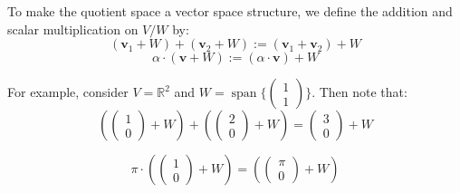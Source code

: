 To make the quotient space a vector space structure, we define the addition and scalar multiplication on \( V/W \) by:
\[
(\mathbf{v}_1 + W) + (\mathbf{v}_2 + W) := (\mathbf{v}_1 + \mathbf{v}_2) + W
\]
\[
\alpha \cdot (\mathbf{v} + W) := (\alpha \cdot \mathbf{v}) + W
\]

For example, consider \( V = \mathbb{R}^2 \) and \( W = \operatorname{span}\{\begin{pmatrix}
    1 \\ 1
\end{pmatrix}\} \). Then note that:
\[
\left( \left( \begin{array}{c} 1 \\ 0 \end{array} \right) + W \right)
+ \left( \left( \begin{array}{c} 2  \\ 0 \end{array} \right) + W \right)
=  \left( \begin{array}{c} 3  \\ 0 \end{array} \right) + W 
\]

\[
\pi \cdot \left( \left( \begin{array}{c} 1 \\ 0 \end{array} \right) + W \right)
= \left( \left( \begin{array}{c} \pi \\ 0 \end{array} \right) + W \right)
\]

